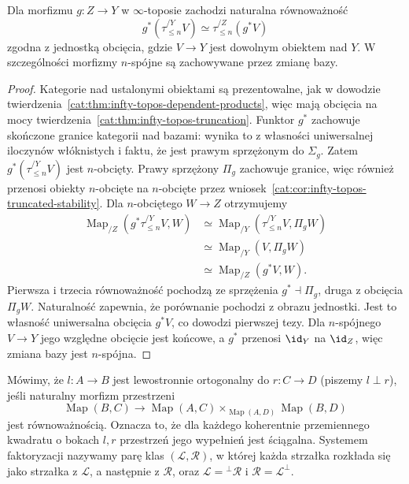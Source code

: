 \begin{stwierdzenie}\label{cat:prop:infty-topos-relative-truncation}
Dla morfizmu $g:Z\to Y$ w $\infty$-toposie zachodzi naturalna równoważność
\[
 g^*(\tau_{\leq n}^{/Y}V)\simeq
 \tau_{\leq n}^{/Z}(g^*V)
\]
zgodna z jednostką obcięcia, gdzie $V\to Y$ jest dowolnym obiektem nad $Y$. W szczególności morfizmy $n$-spójne są zachowywane przez zmianę bazy.
\end{stwierdzenie}
\begin{proof}
Kategorie nad ustalonymi obiektami są prezentowalne, jak w dowodzie twierdzenia~\ref{cat:thm:infty-topos-dependent-products}, więc mają obcięcia na mocy twierdzenia~\ref{cat:thm:infty-topos-truncation}. Funktor $g^*$ zachowuje skończone granice kategorii nad bazami: wynika to z własności uniwersalnej iloczynów włóknistych i faktu, że jest prawym sprzężonym do $\Sigma_g$. Zatem $g^*(\tau_{\leq n}^{/Y}V)$ jest $n$-obcięty. Prawy sprzężony $\Pi_g$ zachowuje granice, więc również przenosi obiekty $n$-obcięte na $n$-obcięte przez wniosek~\ref{cat:cor:infty-topos-truncated-stability}. Dla $n$-obciętego $W\to Z$ otrzymujemy
\[
\begin{aligned}
 \operatorname{Map}_{/Z}(g^*\tau_{\leq n}^{/Y}V,W)
 &\simeq\operatorname{Map}_{/Y}(\tau_{\leq n}^{/Y}V,\Pi_g W)\\
 &\simeq\operatorname{Map}_{/Y}(V,\Pi_g W)\\
 &\simeq\operatorname{Map}_{/Z}(g^*V,W).
\end{aligned}
\]
Pierwsza i trzecia równoważność pochodzą ze sprzężenia $g^*\dashv\Pi_g$, druga z obcięcia $\Pi_gW$. Naturalność zapewnia, że porównanie pochodzi z obrazu jednostki. Jest to własność uniwersalna obcięcia $g^*V$, co dowodzi pierwszej tezy. Dla $n$-spójnego $V\to Y$ jego względne obcięcie jest końcowe, a $g^*$ przenosi $\id_Y$ na $\id_Z$, więc zmiana bazy jest $n$-spójna.
\end{proof}

\begin{definicja}\label{cat:def:infty-topos-orthogonal}
Mówimy, że $l:A\to B$ jest lewostronnie ortogonalny do $r:C\to D$ (piszemy $l\perp r$), jeśli naturalny morfizm przestrzeni
\[
 \operatorname{Map}(B,C)\longrightarrow
 \operatorname{Map}(A,C)\times_{\operatorname{Map}(A,D)}
                         \operatorname{Map}(B,D)
\]
jest równoważnością. Oznacza to, że dla każdego koherentnie przemiennego kwadratu o bokach $l,r$ przestrzeń jego wypełnień jest ściągalna. Systemem faktoryzacji nazywamy parę klas $(\mathcal L,\mathcal R)$, w której każda strzałka rozkłada się jako strzałka z $\mathcal L$, a następnie z $\mathcal R$, oraz $\mathcal L={}^{\perp}\mathcal R$ i $\mathcal R=\mathcal L^\perp$.
\end{definicja}

